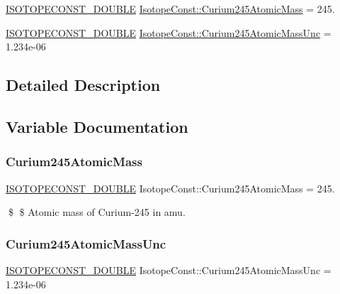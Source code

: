 \begin{DoxyCompactItemize}
\item 
\mbox{\hyperlink{group___isotope_const-_macros_ga8f45a7272ce02c0b4c65c44636ed719a}{I\+S\+O\+T\+O\+P\+E\+C\+O\+N\+S\+T\+\_\+\+D\+O\+U\+B\+LE}} \mbox{\hyperlink{group___isotope_const-_curium-_cm245_gaefa59b14e44759162be2262268bfe202}{Isotope\+Const\+::\+Curium245\+Atomic\+Mass}} = 245.
\item 
\mbox{\hyperlink{group___isotope_const-_macros_ga8f45a7272ce02c0b4c65c44636ed719a}{I\+S\+O\+T\+O\+P\+E\+C\+O\+N\+S\+T\+\_\+\+D\+O\+U\+B\+LE}} \mbox{\hyperlink{group___isotope_const-_curium-_cm245_ga5fc4972d3982c8ed2dec0b0a204e15f6}{Isotope\+Const\+::\+Curium245\+Atomic\+Mass\+Unc}} = 1.\+234e-\/06
\end{DoxyCompactItemize}


\subsection{Detailed Description}


\subsection{Variable Documentation}
\mbox{\label{group___isotope_const-_curium-_cm245_gaefa59b14e44759162be2262268bfe202}} 
\subsubsection{\texorpdfstring{Curium245\+Atomic\+Mass}{Curium245AtomicMass}}
{\footnotesize\ttfamily \mbox{\hyperlink{group___isotope_const-_macros_ga8f45a7272ce02c0b4c65c44636ed719a}{I\+S\+O\+T\+O\+P\+E\+C\+O\+N\+S\+T\+\_\+\+D\+O\+U\+B\+LE}} Isotope\+Const\+::\+Curium245\+Atomic\+Mass = 245.}

\$ \$ Atomic mass of Curium-\/245 in amu. \mbox{\label{group___isotope_const-_curium-_cm245_ga5fc4972d3982c8ed2dec0b0a204e15f6}} 
\subsubsection{\texorpdfstring{Curium245\+Atomic\+Mass\+Unc}{Curium245AtomicMassUnc}}
{\footnotesize\ttfamily \mbox{\hyperlink{group___isotope_const-_macros_ga8f45a7272ce02c0b4c65c44636ed719a}{I\+S\+O\+T\+O\+P\+E\+C\+O\+N\+S\+T\+\_\+\+D\+O\+U\+B\+LE}} Isotope\+Const\+::\+Curium245\+Atomic\+Mass\+Unc = 1.\+234e-\/06}

